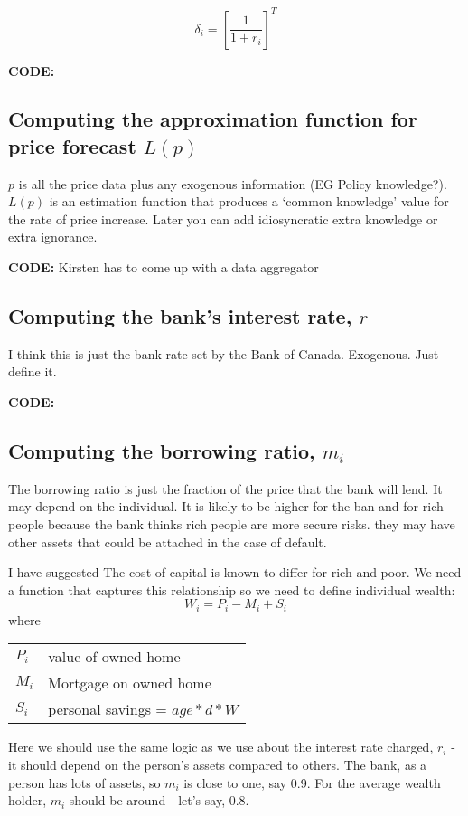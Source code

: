 \[\delta_i=\left[\frac{1}{1+r_i}\right]^T\]

\textbf{CODE:}  
\subsection{Computing the approximation function for price forecast $L(p)$}
$p$ is all the price data plus any exogenous information (EG Policy knowledge?). $L(p)$ is an estimation function that produces a `common knowledge' value for the rate of price increase. Later you can add idiosyncratic extra knowledge or extra ignorance.

\textbf{CODE:}  Kirsten has to come up with a data aggregator 



\subsection{Computing the bank's interest rate, $r$}

I think this is just the bank rate set by the Bank of Canada. Exogenous. Just define it.

\textbf{CODE:}  

\subsection{Computing the borrowing ratio, $m_i$}
The borrowing ratio is just the fraction of the price that the bank will lend. It may depend on the individual. It is likely to be higher for the ban and for rich people because the bank thinks rich people are more secure risks. they may have other assets that could be attached in the case of default.


I have suggested The cost of capital is known to differ for rich and poor. We need a function that captures this relationship so we need to define individual wealth:
\[W_i= P_i -M_i  +S_i\]
where 

\begin{tabular}{ll}
$P_i$ & value of owned home\\
$M_i$ & Mortgage on owned home\\
$S_i$ & personal savings = $age*d*W$\\
\end{tabular}

Here we should use the same logic as we use about the interest rate charged, $r_i$ - it should depend on the person's assets compared to others. The bank, as a person has lots of assets, so $m_i$ is close to one, say 0.9. For the average wealth holder, $m_i$ should be around - let's say, 0.8. 

